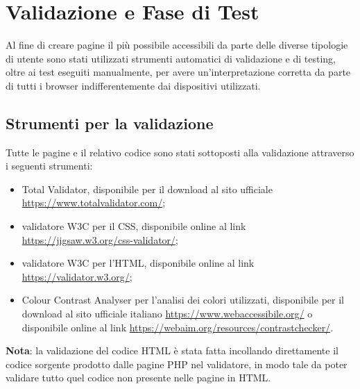 \section{Validazione e Fase di Test}
Al fine di creare pagine il più possibile accessibili da parte delle diverse tipologie di utente sono stati utilizzati strumenti automatici di validazione e di testing, oltre ai test eseguiti manualmente, per avere un'interpretazione corretta da parte di tutti i browser indifferentemente dai dispositivi utilizzati.

\subsection{Strumenti per la validazione}
Tutte le pagine e il relativo codice sono stati sottoposti alla validazione attraverso i seguenti strumenti:
\begin{itemize}
	\item Total Validator, disponibile per il download al sito ufficiale \url{https://www.totalvalidator.com/};
	\item validatore W3C per il CSS, disponibile online al link \url{https://jigsaw.w3.org/css-validator/};
	\item validatore W3C per l'HTML, disponibile online al link \url{https://validator.w3.org/};
	\item Colour Contrast Analyser per l'analisi dei colori utilizzati, disponibile per il download al sito ufficiale italiano \url{https://www.webaccessibile.org/} o disponibile online al link \url{https://webaim.org/resources/contrastchecker/}.
\end{itemize}
\textbf{Nota}: la validazione del codice HTML è stata fatta incollando direttamente il codice sorgente prodotto dalle pagine PHP nel validatore, in modo tale da poter validare tutto quel codice non presente nelle pagine in HTML.

